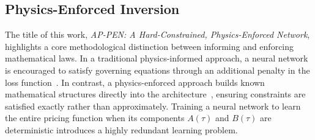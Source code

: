 \documentclass[sigconf, authorversion=true, nonacm=true]{acmart}
\newcommand{\meanrev}{\kappa}               %
\newcommand{\longrun}{\alpha}               %
\begin{document}

\subsection{Physics-Enforced Inversion}
\label{sec:pinn_inversion}
The title of this work, \textit{AP-PEN: A Hard-Constrained, Physics-Enforced Network}, highlights a core methodological distinction between informing and enforcing mathematical laws. In a traditional physics-informed approach, a neural network is encouraged to satisfy governing equations through an additional penalty in the loss function~\cite{Raissi2019Physics-informedEquations, Hoshisashi2024Physics-InformedPDEs}. In contrast, a physics-enforced approach builds known mathematical structures directly into the architecture~\cite{rackauckas2020universal}, ensuring constraints are satisfied exactly rather than approximately. Training a neural network to learn the entire pricing function when its components $A(\tau)$ and $B(\tau)$ are deterministic introduces a highly redundant learning problem. 
\end{document}
